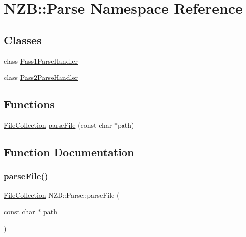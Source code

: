 \hypertarget{namespace_n_z_b_1_1_parse}{}\section{N\+ZB\+:\+:Parse Namespace Reference}
\label{namespace_n_z_b_1_1_parse}
\subsection*{Classes}
\begin{DoxyCompactItemize}
\item 
class \hyperlink{class_n_z_b_1_1_parse_1_1_pass1_parse_handler}{Pass1\+Parse\+Handler}
\item 
class \hyperlink{class_n_z_b_1_1_parse_1_1_pass2_parse_handler}{Pass2\+Parse\+Handler}
\end{DoxyCompactItemize}
\subsection*{Functions}
\begin{DoxyCompactItemize}
\item 
\hyperlink{class_n_z_b_1_1_file_collection}{File\+Collection} \hyperlink{namespace_n_z_b_1_1_parse_a5dfbffe6770e91f5a934cbc819d2fe72}{parse\+File} (const char $\ast$path)
\end{DoxyCompactItemize}


\subsection{Function Documentation}
\hypertarget{namespace_n_z_b_1_1_parse_a5dfbffe6770e91f5a934cbc819d2fe72}{}\label{namespace_n_z_b_1_1_parse_a5dfbffe6770e91f5a934cbc819d2fe72} 
\subsubsection{\texorpdfstring{parse\+File()}{parseFile()}}
{\footnotesize\ttfamily \hyperlink{class_n_z_b_1_1_file_collection}{File\+Collection} N\+Z\+B\+::\+Parse\+::parse\+File (\begin{DoxyParamCaption}\item[{const char $\ast$}]{path }\end{DoxyParamCaption})}

